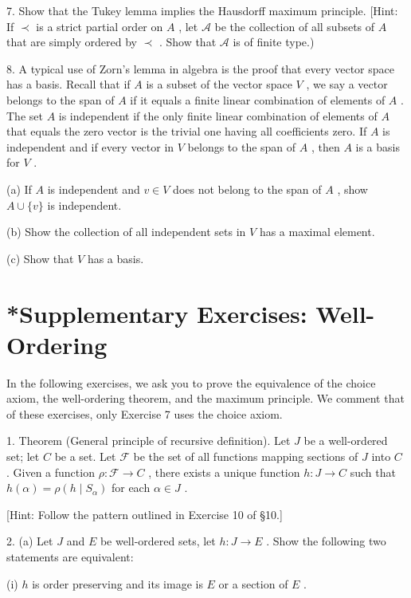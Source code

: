 \documentclass[10pt]{article}
\begin{document}
7. Show that the Tukey lemma implies the Hausdorff maximum principle. [Hint: If \(\prec\) is a strict partial order on \(A\) , let \(\mathcal{A}\) be the collection of all subsets of \(A\) that are simply ordered by \(\prec\) . Show that \(\mathcal{A}\) is of finite type.)

8. A typical use of Zorn's lemma in algebra is the proof that every vector space has a basis. Recall that if \(A\) is a subset of the vector space \(V\) , we say a vector belongs to the span of \(A\) if it equals a finite linear combination of elements of \(A\) . The set \(A\) is independent if the only finite linear combination of elements of \(A\) that equals the zero vector is the trivial one having all coefficients zero. If \(A\) is independent and if every vector in \(V\) belongs to the span of \(A\) , then \(A\) is a basis for \(V\) .

(a) If \(A\) is independent and \(v \in  V\) does not belong to the span of \(A\) , show \(A \cup  \{ v\}\) is independent.

(b) Show the collection of all independent sets in \(V\) has a maximal element.

(c) Show that \(V\) has a basis.

\section*{*Supplementary Exercises: Well-Ordering}

In the following exercises, we ask you to prove the equivalence of the choice axiom, the well-ordering theorem, and the maximum principle. We comment that of these exercises, only Exercise 7 uses the choice axiom.

1. Theorem (General principle of recursive definition). Let \(J\) be a well-ordered set; let \(C\) be a set. Let \(\mathcal{F}\) be the set of all functions mapping sections of \(J\) into \(C\) . Given a function \(\rho  : \mathcal{F} \rightarrow  C\) , there exists a unique function \(h : J \rightarrow  C\) such that \(h\left( \alpha \right)  = \rho \left( {h \mid  {S}_{\alpha }}\right)\) for each \(\alpha  \in  J\) .

[Hint: Follow the pattern outlined in Exercise 10 of §10.]

2. (a) Let \(J\) and \(E\) be well-ordered sets, let \(h : J \rightarrow  E\) . Show the following two statements are equivalent:

(i) \(h\) is order preserving and its image is \(E\) or a section of \(E\) .
\end{document}

